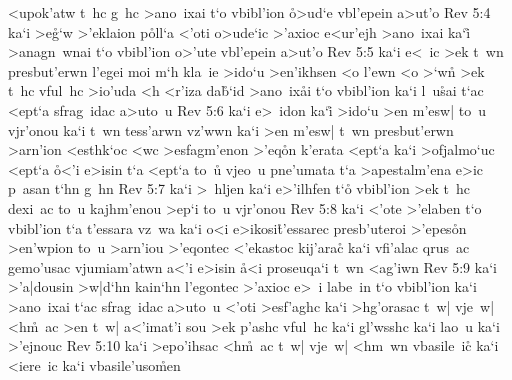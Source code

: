 <upok'atw
t~hc
g~hc
>ano~ixai
t`o
vbibl'ion
\r{o}>ud`e
vbl'epein
a>ut'o\bibvsend
\vs Rev 5:4
ka`i
>e\r{g}`w
>'eklaion
p\r{o}ll`a
<'oti
o>ude`ic
>'axioc
e<ur'ejh
>ano~ixai
ka`i\r{}
>anagn~wnai
t`o
vbibl'ion
o>'ute
vbl'epein
a>ut'o\bibvsend
\vs Rev 5:5
ka`i
e<~ic
>ek
t~wn
presbut'erwn
l'egei
moi
m`h
kla~ie
>ido`u
>en'ikhsen
<o
l'ewn
<o
>`w\r{n}
>ek
t~hc
vful~hc
>io'uda
<h
<r'iza
da\r{b}`id
>ano~ix\r{a}i
t`o
vbibl'ion
ka`i
l~u\r{s}ai
t`ac
<ept`a
sfrag~idac
a>uto~u\bibvsend
\vs Rev 5:6
ka`i
e>~idon
ka`i\r{}
>ido`u
>en
m'esw|
to~u
vjr'onou
ka`i
t~wn
tess'arwn
vz'wwn
ka`i
>en
m'esw|
t~wn
presbut'erwn
>arn'ion
<esthk`oc
<wc
>esfagm'enon
>'eq\r{o}n
k'erata
<ept`a
ka`i
>ofjalmo`uc
<ept`a
\r{o}<'i
e>isin
t`a
<ept`a
to~u\r{}
vjeo~u
pne'umata
t`a
>apestalm'ena
e>ic
p~asan
t`hn
g~hn\bibvsend
\vs Rev 5:7
ka`i
>~hljen
ka`i
e>'ilhfen
t`o\r{}
vbibl'ion
>ek
t~hc
dexi~ac
to~u
kajhm'enou
>ep`i
to~u
vjr'onou\bibvsend
\vs Rev 5:8
ka`i
<'ote
>'elaben
t`o
vbibl'ion
t`a
t'essara
vz~wa
ka`i
o<i
e>ikosi\r{t}'essarec
presb'uteroi
>'epes\r{o}n
>en'wpion
to~u
>arn'iou
>'eqontec
<'ekastoc
kij'ara\r{c}
ka`i
vfi'alac
qrus~ac
gemo'usac
vjumiam'atwn
a<'i
e>isin
\r{a}<i
proseuqa`i
t~wn
<ag'iwn\bibvsend
\vs Rev 5:9
ka`i
>'a|dousin
>w|d`hn
kain`hn
l'egontec
>'axioc
e>~i
labe~in
t`o
vbibl'ion
ka`i
>ano~ixai
t`ac
sfrag~idac
a>uto~u
<'oti
>esf'aghc
ka`i
>hg'orasac
t~w|
vje~w|
<h\r{m}~ac
>en
t~w|
a<'imat'i
sou
>ek
p'ashc
vful~hc
ka`i
gl'wsshc
ka`i
lao~u
ka`i
>'ejnouc\bibvsend
\vs Rev 5:10
ka`i
>epo'ihsac
<h\r{m}~ac
t~w|
vje~w|
<hm~wn
vbasile~i\r{c}
ka`i
<iere~ic
ka`i
vbasile'uso\r{m}en
